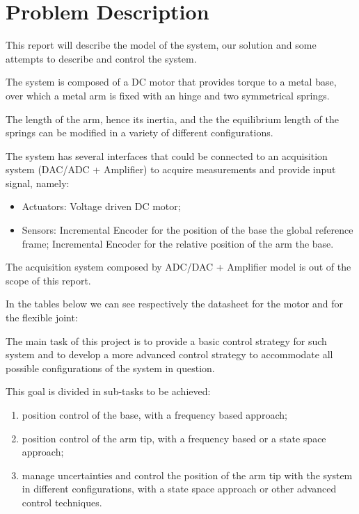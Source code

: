 \chapter{Problem Description}
\label{cha:problem_description}

    This report will describe the model of the system, our solution and some attempts to describe and control the system.

    The system is composed of a DC motor that provides torque to a metal base, over which a metal arm is fixed with an hinge and two symmetrical springs.

    The length of the arm, hence its inertia, and the the equilibrium length of the springs can be modified in a variety of different configurations.

    The system has several interfaces that could be connected to an acquisition system (DAC/ADC + Amplifier) to acquire measurements and provide input signal, namely:
    \begin{itemize}
        \item Actuators:
            \subitem Voltage driven DC motor;
        \item Sensors:
            \subitem Incremental Encoder for the position of the base \wrt the global reference frame;
            \subitem Incremental Encoder for the relative position of the arm \wrt the base.
    \end{itemize}
    The acquisition system composed by ADC/DAC + Amplifier model is out of the scope of this report.

    In the tables below we can see respectively the datasheet for the motor and for the flexible joint:


    The main task of this project is to provide a basic control strategy for such system and to develop a more advanced control strategy to accommodate all possible configurations of the system in question.
    
    This goal is divided in sub-tasks to be achieved:
    \begin{enumerate}
        \item position control of the base, with a frequency based approach;
        \item position control of the arm tip, with a frequency based or a state space approach;
        \item manage uncertainties and control the position of the arm tip with the system in different configurations, with a state space approach or other advanced control techniques.
    \end{enumerate}






